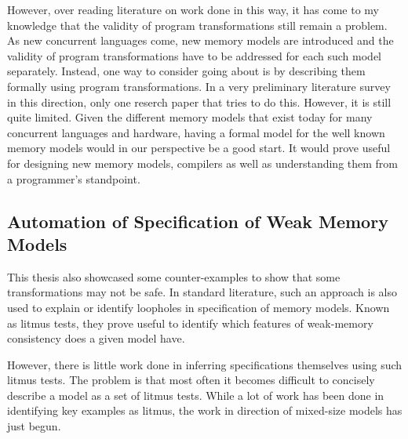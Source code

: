         However, over reading literature on work done in this way, it has come to my knowledge that the validity of program transformations still remain a problem. As new concurrent languages come, new memory models are introduced and the validity of program transformations have to be addressed for each such model separately. Instead, one way to consider going about is by describing them formally using program transformations. In a very preliminary literature survey in this direction, only one reserch paper \cite{DBLP:conf/fm/LahavV16} that tries to do this. However, it is still quite limited. Given the different memory models that exist today for many concurrent languages and hardware, having a formal model for the well known memory models would in our perspective be a good start. It would prove useful for designing new memory models, compilers as well as understanding them from a programmer's standpoint. 

    \subsection{Automation of Specification of Weak Memory Models}

        This thesis also showcased some counter-examples to show that some transformations may not be safe. In standard literature, such an approach is also used to explain or identify loopholes in specification of memory models. Known as litmus tests, they prove useful to identify which features of weak-memory consistency does a given model have. 

        However, there is little work done in inferring specifications themselves using such litmus tests. The problem is that most often it becomes difficult to concisely describe a model as a set of litmus tests. While a lot of work has been done in identifying key examples as litmus, the work in direction of mixed-size models has just begun. 

